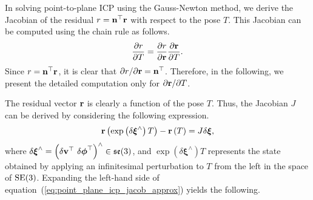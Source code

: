 In solving point-to-plane ICP using the Gauss-Newton method, we derive the Jacobian of the residual $r = {\bf n}^{\top} {\bf r}$ with respect to the pose $T$.
This Jacobian can be computed using the chain rule as follows.
%
\begin{align}
  \frac{ \partial r }{ \partial T } = \frac{ \partial r }{ \partial {\bf r} }
                                      \frac{ \partial {\bf r} }{ \partial T }.
\end{align}
%
Since $r = {\bf n}^{\top} {\bf r}$, it is clear that $\partial r / \partial {\bf r} = {\bf n}^{\top}$.
Therefore, in the following, we present the detailed computation only for $\partial {\bf r} / \partial T$.

The residual vector ${\bf r}$ is clearly a function of the pose $T$.
Thus, the Jacobian $J$ can be derived by considering the following expression.
%
\begin{align}
  {\bf r} \left( \exp \left( \delta \boldsymbol \xi^{\wedge} \right) T \right) - {\bf r} \left( T \right) =
  J \delta \boldsymbol \xi,
  \label{eq:point_plane_icp_jacob_approx}
\end{align}
%
where $\delta \boldsymbol{\xi}^{\wedge} = \left( \delta {\bf v}^{\top} ~ \delta \boldsymbol{\phi}^{\top} \right)^{\wedge} \in \mathfrak{se}(3)$, and $\exp \left( \delta \boldsymbol{\xi}^{\wedge} \right) T$ represents the state obtained by applying an infinitesimal perturbation to $T$ from the left in the space of ${\rm SE}(3)$.
Expanding the left-hand side of equation~(\ref{eq:point_plane_icp_jacob_approx}) yields the following.
%
